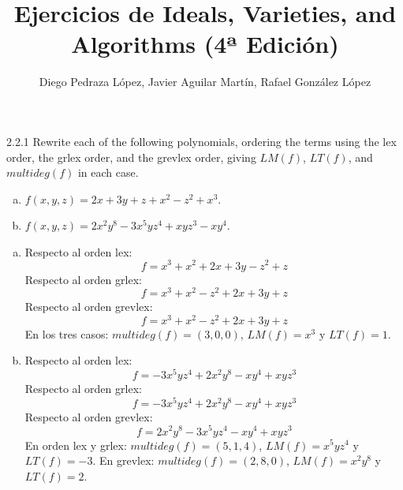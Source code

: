 \documentclass[twoside]{article}
\begin{document}
\title{Ejercicios de Ideals, Varieties, and Algorithms (4ª Edición)}
\author{Diego Pedraza López, Javier Aguilar Martín, Rafael González López}
\maketitle

\begin{ejercicio}{2.2.1}
Rewrite each of the following polynomials, ordering the terms using the lex order, the grlex order, and the grevlex order, giving $LM(f)$, $LT(f)$, and $multideg(f)$ in each case.
\begin{enumerate}[a.]
\item $f(x,y,z) = 2x + 3y + z + x^2- z^2 + x^3$.
\item $f(x,y,z) = 2x^2y^8 - 3x^5yz^4 + xyz^3 - xy^4$.
\end{enumerate}
\end{ejercicio}
\begin{solucion}\mbox{}
\begin{enumerate}[a.]
\item Respecto al orden lex:
 \[ f = x^3 + x^2 + 2x + 3y - z^2 + z \]
 Respecto al orden grlex:
 \[ f = x^3 + x^2 - z^2 + 2x + 3y + z \]
 Respecto al orden grevlex:
 \[ f = x^3 + x^2 - z^2 + 2x + 3y + z \]
 En los tres casos: $multideg(f)=(3,0,0)$, $LM(f)=x^3$ y $LT(f)=1$.
\item Respecto al orden lex:
 \[ f = -3x^5yz^4 + 2x^2y^8 - xy^4 + xyz^3 \]
 Respecto al orden grlex:
 \[ f = -3x^5yz^4 + 2x^2y^8 - xy^4 + xyz^3 \]
 Respecto al orden grevlex:
 \[ f = 2x^2y^8 -3x^5yz^4 - xy^4 + xyz^3\]
 En orden lex y grlex: $multideg(f)=(5,1,4)$, $LM(f)=x^5yz^4$ y $LT(f)=-3$. En grevlex: $multideg(f)=(2,8,0)$, $LM(f)=x^2y^8$ y $LT(f)=2$.
\end{enumerate}
\end{solucion}

\newpage
\end{document}
